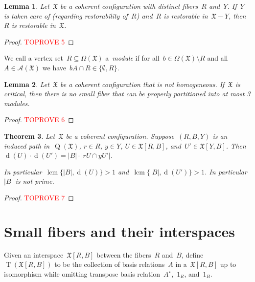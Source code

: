 \documentclass[english,a4paper]{article}
\theoremstyle{plain}
\newtheorem{theorem}             {Theorem}[section]
\newtheorem{lemma}      [theorem]{Lemma}
\theoremstyle{definition}
\newcommand{\abs}[1]{| #1 |}
\DeclareMathOperator{\lcm}{lcm}
\newcommand{\coherentConfig}{\ensuremath{\mathfrak{X}}}
\newcommand{\interspace}[2]{\ensuremath{\coherentConfig[#1,#2]}}
\newcommand{\intDegree}[1]{\ensuremath{\Deg \left( #1 \right)}}
\DeclareMathOperator*{\Type}{T}
\newcommand{\type}[1]{\ensuremath{\Type\left(#1\right)}}
\newcommand{\vertices}{\ensuremath{\Omega}}
\newcommand{\relations}{\ensuremath{\mathcal{A}}}
\newcommand{\arcs}{\ensuremath{A}}
\DeclareMathOperator*{\Quotient}{Q}
\newcommand{\quotientGraph}[1]{\ensuremath{\Quotient(#1)}}
\DeclareMathOperator{\Deg}{d}
\begin{document}
\begin{lemma}
    \label{critical:restorable:take-care/lem}
    Let~$\coherentConfig$ be a coherent configuration with distinct fibers~$R$ and~$Y$.
    If~$Y$ is taken care of (regarding restorability of~$R$) and~$R$ is restorable in~$\coherentConfig-Y$, then~$R$ is restorable in~$\coherentConfig$.
\end{lemma}
\begin{proof}\textcolor{red}{TOPROVE 5}\end{proof}


We call a vertex set~$R \subseteq \vertices(\coherentConfig)$ a~\emph{module} if for all~$b \in \vertices(\coherentConfig) \setminus R$ and all~$\arcs \in \relations(\coherentConfig)$ we have~$b\arcs \cap R \in \{\emptyset, R\}$.


\begin{lemma}
\label{critical:small-cc:module/lem}
    Let~$\coherentConfig$ be a coherent configuration that is not homogeneous.
    If~$\coherentConfig$ is critical, then there is no small fiber that can be properly partitioned into at most 3 modules.
\end{lemma}
\begin{proof}\textcolor{red}{TOPROVE 6}\end{proof}


\begin{theorem}
\label{interspace-divisor/thm}
    Let~$\coherentConfig$ be a coherent configuration.
    Suppose~$(R,B,Y)$ is an induced path in~$\quotientGraph{\coherentConfig}$, $r \in R$, $y \in Y$, $U \in \interspace{R}{B}$, and~$U' \in \interspace{Y}{B}$.
    Then~$\intDegree{U} \cdot \intDegree{U'} = \abs{B} \cdot \abs{rU \cap yU'}$.

    In particular~$\lcm\{\abs{B}, \intDegree{U}\}>1$ and~$\lcm\{\abs{B}, \intDegree{U'}\}>1$. In particular~$\abs{B}$ is not prime.
\end{theorem}
\begin{proof}\textcolor{red}{TOPROVE 7}\end{proof}
     

\section{Small fibers and their interspaces}
\label{small-cc/sec}


Given an interspace~$\interspace{R}{B}$ between the fibers~$R$ and~$B$, define~$\type{\interspace{R}{B}}$ to be the collection of basis relations~$\arcs$ in a~$\interspace{R}{B}$ up to isomorphism while omitting transpose basis relation~$\arcs^\star$,~$1_R$, and~$1_B$.
\end{document}
